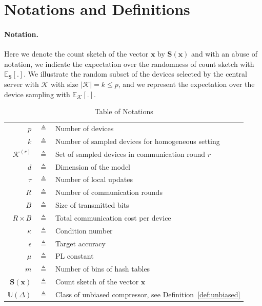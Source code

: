 \documentclass[11pt]{article}
\begin{document}
\section{Notations and Definitions}

\paragraph{Notation.} Here we denote the count sketch of the vector $\boldsymbol{x}$ by $\mathbf{S}(\boldsymbol{x})$ and with an abuse of notation, we indicate the expectation over the randomness of count sketch with $\mathbb{E}_{\mathbf{S}}[.]$. 
We illustrate the random subset of the devices selected by the central server with $\mathcal{K}$ with size $|\mathcal{K}|=k\leq p$, and we represent the expectation over the device sampling with $\mathbb{E}_{\mathcal{K}}[.]$. 


\begin{table}[htbp]\caption{Table of Notations}
\begin{center}%
\begin{tabular}{r c p{10cm} }
\toprule
$p$ & $\triangleq$ & Number of devices\\
$k$ & $\triangleq$ & Number of sampled devices for homogeneous setting\\
$\mathcal{K}^{(r)}$ & $\triangleq$ & Set of sampled devices in communication round $r$\\
$d$ & $\triangleq$ &  Dimension of the model \\
$\tau$ & $\triangleq$ & Number of local updates\\
$R$ & $\triangleq$ & Number of communication rounds\\
$B$ & $\triangleq$ &  Size of transmitted bits \\
$R\times B$ & $\triangleq$ &  Total communication cost per device \\
$\kappa$ & $\triangleq$ & Condition number\\
$\epsilon$ & $\triangleq$ & Target accuracy\\
$\mu$ & $\triangleq$ & PL constant \\
$m$ & $\triangleq$ &  Number of bins of hash tables \\
 $\mathbf{S}(\boldsymbol{x})$  & $\triangleq$ &  Count sketch of the vector $\boldsymbol{x}$\\
 $\mathbb{U}(\Delta)$  & $\triangleq$ &  Class of unbiased compressor, see Definition~\ref{def:unbiased}\\
\bottomrule
\end{tabular}
\end{center}
\label{tab:notations}
\end{table}
\end{document}
